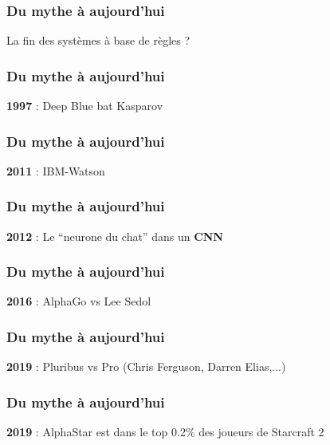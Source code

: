 \documentclass{formation}
\begin{document}
\begin{frame}
  \frametitle{Du mythe à aujourd'hui}
  La fin des systèmes à base de règles ?
\end{frame}

\begin{frame}
  \frametitle{Du mythe à aujourd'hui}
  \textbf{1997} : Deep Blue bat Kasparov
\end{frame}

\begin{frame}
  \frametitle{Du mythe à aujourd'hui}
  \textbf{2011} : IBM-Watson
\end{frame}

\begin{frame}
  \frametitle{Du mythe à aujourd'hui}
  \textbf{2012} : Le ``neurone du chat'' dans un \textbf{CNN}
\end{frame}

\begin{frame}
  \frametitle{Du mythe à aujourd'hui}
  \textbf{2016} : AlphaGo vs Lee Sedol
\end{frame}

\begin{frame}
  \frametitle{Du mythe à aujourd'hui}
  \textbf{2019} : Pluribus vs Pro (Chris Ferguson, Darren Elias,...)
\end{frame}

\begin{frame}
  \frametitle{Du mythe à aujourd'hui}
  \textbf{2019} : AlphaStar est dans le top 0.2\% des joueurs de Starcraft 2
\end{frame}
\end{document}
